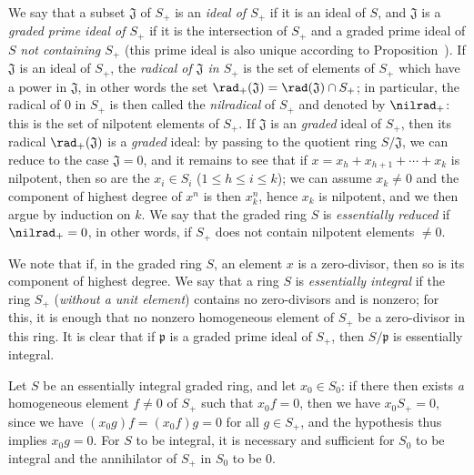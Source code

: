 \begin{env}[2.1.10]
\label{II.2.1.10}
We say that a subset $\mathfrak{J}$ of $S_+$ is an \emph{ideal of $S_+$} if it is an ideal of $S$, and $\mathfrak{J}$ is a \emph{graded prime ideal of $S_+$} if it is the intersection of $S_+$ and a graded prime ideal of $S$ \emph{not containing $S_+$} (this prime ideal is also unique according to Proposition~).
If $\mathfrak{J}$ is an ideal of $S_+$, the \emph{radical of $\mathfrak{J}$ in $S_+$} is the set of elements of $S_+$ which have a power in $\mathfrak{J}$, in other words the set $\rad_+(\mathfrak{J})=\rad(\mathfrak{J})\cap S_+$;
in particular, the radical of $0$ in $S_+$ is then called the \emph{nilradical} of $S_+$ and denoted by $\nilrad_+$: this is the set of nilpotent elements of $S_+$.
If $\mathfrak{J}$ is an \emph{graded} ideal of $S_+$, then its radical $\rad_+(\mathfrak{J})$ is a \emph{graded} ideal: by passing to the quotient ring $S/\mathfrak{J}$, we can reduce to the case $\mathfrak{J}=0$, and it remains to see that if $x=x_h+x_{h+1}+\cdots+x_k$ is nilpotent, then so are the $x_i\in S_i$ ($1\leq h\leq i\leq k$);
we can assume $x_k\neq 0$ and the component of highest degree of $x^n$ is then $x_k^n$, hence $x_k$ is nilpotent, and we then argue by induction on $k$.
We say that the graded ring $S$ is \emph{essentially reduced} if $\nilrad_+=0$, in other words, if $S_+$ does not contain nilpotent elements $\neq 0$.
\end{env}

\begin{env}[2.1.11]
\label{II.2.1.11}
We note that if, in the graded ring $S$, an element $x$ is a zero-divisor, then so is its component of highest degree.
We say that a ring $S$ is \emph{essentially integral} if the ring $S_+$ (\emph{without a unit element}) contains no zero-divisors and is nonzero;
for this, it is enough that no nonzero homogeneous element of $S_+$ be a zero-divisor in this ring.
It is clear that if $\mathfrak{p}$ is a graded prime ideal of $S_+$, then $S/\mathfrak{p}$ is essentially integral.

Let $S$ be an essentially integral graded ring, and let $x_0\in S_0$:
if there then exists \emph{a} homogeneous element $f\neq 0$ of $S_+$ such that $x_0 f=0$, then we have $x_0 S_+=0$, since we have $(x_0 g)f=(x_0 f)g=0$ for all $g\in S_+$, and the hypothesis thus implies $x_0 g=0$.
For $S$ to be integral, it is necessary and sufficient for $S_0$ to be integral and the annihilator of $S_+$ in $S_0$ to be $0$.
\end{env}


